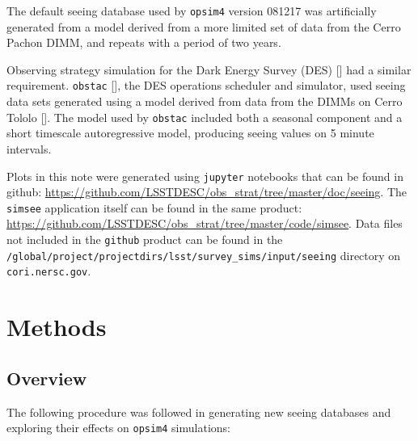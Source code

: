 \documentclass[\docopts]{\docclass}
\begin{document}
The default seeing database used by \texttt{opsim4} version 081217 was
artificially generated from a model derived from a more limited set of
data from the Cerro Pachon DIMM, and repeats with a period of two
years.

Observing strategy simulation for the Dark Energy Survey (DES)
[\cite{2016MNRAS.460.1270D}] had a similar
requirement. \texttt{obstac} [\cite{2014ASPC..485...77N}], the DES operations
scheduler and simulator, used seeing data sets generated using a model
derived from data from the DIMMs on Cerro
Tololo [\cite{2012ASPC..461..201N}]. The model used by \texttt{obstac} included
both a seasonal component and a short timescale autoregressive model,
producing seeing values on 5 minute intervals.

Plots in this note were generated using \texttt{jupyter} notebooks
that can be found in github:
\url{https://github.com/LSSTDESC/obs_strat/tree/master/doc/seeing}. The
\texttt{simsee} application itself can be found in the same product:
\url{https://github.com/LSSTDESC/obs_strat/tree/master/code/simsee}. Data
files not included in the \texttt{github} product can be found in the
\texttt{/global/project/projectdirs/lsst/survey\_sims/input/seeing}
directory on \texttt{cori.nersc.gov}.


\section{Methods}
\label{sec:methods}

\subsection{Overview}
\label{sec:overview}

The following procedure was followed in generating new seeing
databases and exploring their effects on \texttt{opsim4} simulations:
\end{document}

